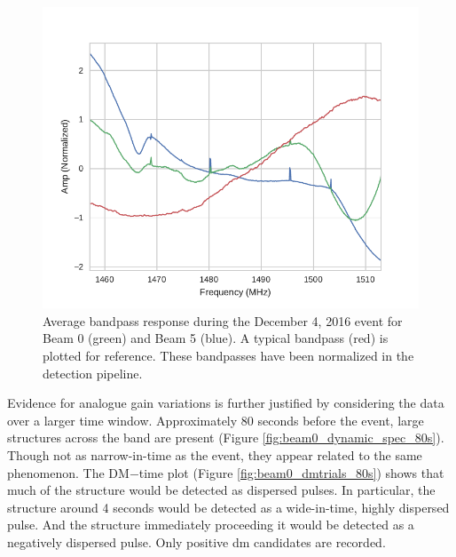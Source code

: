 \documentclass[a4paper,fleqn,usenatbib]{mnras}
\begin{document}
\begin{figure}
    \includegraphics[width=1.0\linewidth]{figures/bandpass_response.pdf}
    \caption{Average bandpass response during the December 4, 2016 event for
    Beam 0 (green) and Beam 5 (blue). A typical bandpass (red) is plotted for
    reference. These bandpasses have been normalized in the detection pipeline.
    }
    \label{fig:bandpass_response}
\end{figure}

Evidence for analogue gain variations is further justified by considering the
data over a larger time window.  Approximately 80 seconds before the event,
large structures across the band are present (Figure
\ref{fig:beam0_dynamic_spec_80s}). Though not as narrow-in-time as the event,
they appear related to the same phenomenon.  The DM$-$time plot (Figure
\ref{fig:beam0_dmtrials_80s}) shows that much of the structure would be detected
as dispersed pulses.  In particular, the structure around 4 seconds would be
detected as a wide-in-time, highly dispersed pulse.  And the structure
immediately proceeding it would be detected as a negatively dispersed pulse.
Only positive \gls{dm} candidates are recorded.
\end{document}

